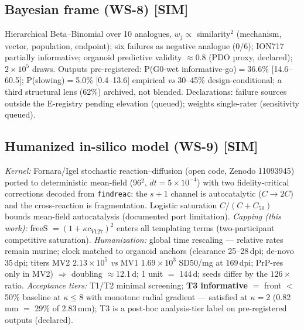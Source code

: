\documentclass[10pt,twocolumn]{article}
\begin{document}
\subsection{Bayesian frame (WS-8) [SIM]}
Hierarchical Beta--Binomial over 10 analogues, $w_j\propto$ similarity$^2$ (mechanism, vector, population, endpoint); six failures as negative analogue (0/6); ION717 partially informative; organoid predictive validity $\approx$0.8 (PDO proxy, declared); $2{\times}10^5$ draws. Outputs pre-registered: P(G0-wet informative-go)$=$36.6\% [14.6--60.5]; P(slowing)$=$5.0\% [0.4--13.6] empirical \emph{vs} 30--45\% design-conditional; a third structural lens (62\%) archived, not blended. Declarations: failure sources outside the E-registry pending elevation (queued); weights single-rater (sensitivity queued).

\subsection{Humanized in-silico model (WS-9) [SIM]}
\emph{Kernel:} Fornara/Igel stochastic reaction--diffusion (open code, Zenodo 11093945) ported to deterministic mean-field (96$^2$, $dt{=}5{\times}10^{-4}$) with two fidelity-critical corrections decoded from \texttt{findreac}: the $s{+}1$ channel is autocatalytic ($C{\to}2C$) and the cross-reaction is fragmentation. Logistic saturation $C/(C+C_{50})$ bounds mean-field autocatalysis (documented port limitation). \emph{Capping (this work):} freeS $=(1+\kappa c_{V127})^2$ enters all templating terms (two-participant competitive saturation). \emph{Humanization:} global time rescaling --- relative rates remain murine; clock matched to organoid anchors (clearance 25--28\,dpi; de-novo 35\,dpi; titers MV2 $2.13{\times}10^5$ \emph{vs} MV1 $1.69{\times}10^3$ SD50/mg at 169\,dpi; PrP-res only in MV2) $\Rightarrow$ doubling $\approx$12.1\,d; 1 unit $=$ 144\,d; seeds differ by the $126\times$ ratio. \emph{Acceptance tiers:} T1/T2 minimal screening; \textbf{T3 informative} $=$ front $<$50\% baseline at $\kappa\le8$ with monotone radial gradient --- satisfied at $\kappa{=}2$ (0.82\,mm $=$ 29\% of 2.83\,mm); T3 is a post-hoc analysis-tier label on pre-registered outputs (declared).
\end{document}
